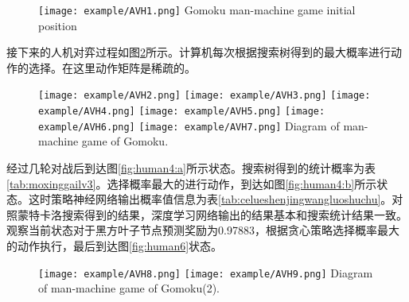 \begin{figure}[htbp]
	\centering
	\texttt{[image: example/AVH1.png]}
	\hspace{0.5cm}
	{Gomoku man-machine game initial position}
	\label{figAIvsHuman}
\end{figure}

接下来的人机对弈过程如图\ref{fig:AIvsHuman}所示。计算机每次根据搜索树得到的最大概率进行动作的选择。在这里动作矩阵是稀疏的。

\begin{figure}[hbtp]
	\centering
	\texttt{[image: example/AVH2.png]}
	\hspace{0.5cm}
	\texttt{[image: example/AVH3.png]}
	\hspace{0.5cm}
	\texttt{[image: example/AVH4.png]}
	\hspace{0.5cm}
	\texttt{[image: example/AVH5.png]}
	\hspace{0.5cm}
	\texttt{[image: example/AVH6.png]}
	\hspace{0.5cm}
	\texttt{[image: example/AVH7.png]}
	{Diagram of man-machine game of Gomoku.}
	\label{fig:AIvsHuman}
\end{figure}


经过几轮对战后到达图\ref{fig:human4:a}所示状态。搜索树得到的统计概率为表\ref{tab:moxinggailv3}。选择概率最大的进行动作，到达如图\ref{fig:human4:b}所示状态。这时策略神经网络输出概率值信息为表\ref{tab:celueshenjingwangluoshuchu}。对照蒙特卡洛搜索得到的结果，深度学习网络输出的结果基本和搜索统计结果一致。观察当前状态对于黑方叶子节点预测奖励为0.97883，根据贪心策略选择概率最大的动作执行，最后到达图\ref{fig:human6}状态。


\begin{figure}[hbpt]
	\centering
	\subcaptionbox{\label{fig:human4:a}}
	{\texttt{[image: example/AVH8.png]}}
	\hspace{0.5em}
	\subcaptionbox{\label{fig:human4:b}}
	{\texttt{[image: example/AVH9.png]}}
	{Diagram of man-machine game of Gomoku(2).}
	\label{fig:human4}
\end{figure}



